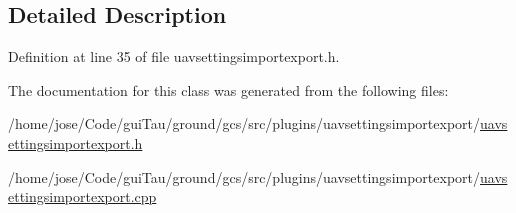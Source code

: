 \subsection{Detailed Description}


Definition at line 35 of file uavsettingsimportexport.\-h.



The documentation for this class was generated from the following files\-:\begin{DoxyCompactItemize}
\item 
/home/jose/\-Code/gui\-Tau/ground/gcs/src/plugins/uavsettingsimportexport/\hyperlink{uavsettingsimportexport_8h}{uavsettingsimportexport.\-h}\item 
/home/jose/\-Code/gui\-Tau/ground/gcs/src/plugins/uavsettingsimportexport/\hyperlink{uavsettingsimportexport_8cpp}{uavsettingsimportexport.\-cpp}\end{DoxyCompactItemize}
